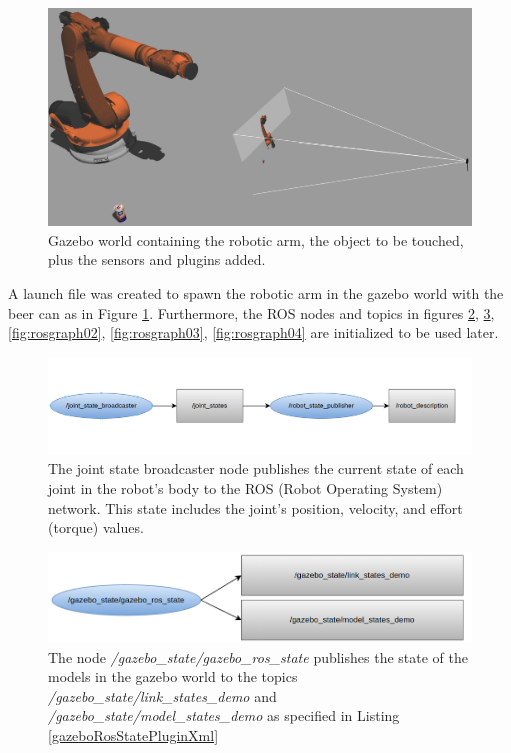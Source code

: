 \documentclass[12pt,oneside]{article}
\begin{document}
\begin{figure}[H]
	\centering
	\includegraphics[width=0.95\linewidth]{kuka4}
	\caption[Gazebo World.]{Gazebo world containing the robotic arm, the object to be touched, plus the sensors and plugins added.}
	\label{fig:kuka4}
\end{figure}

A launch file was created to spawn the robotic arm in the gazebo world with the beer can as in Figure \ref{fig:kuka4}. Furthermore, the ROS nodes and topics in figures \ref{fig:rosgraph00}, \ref{fig:rosgraph01}, \ref{fig:rosgraph02}, \ref{fig:rosgraph03}, \ref{fig:rosgraph04} are initialized to be used later.


\begin{figure}[H]
\centering
\includegraphics[width=0.95\linewidth]{rosgraph00}
\caption[The joint\_state\_broadcaster node.]{The joint state broadcaster node publishes the current state of each joint in the robot's body to the ROS (Robot Operating System) network. This state includes the joint's position, velocity, and effort (torque) values. }
\label{fig:rosgraph00}
\end{figure}
 
\begin{figure}[H]
\centering
\includegraphics[width=0.95\linewidth]{rosgraph01_n}
\caption[The gazebo\_ros\_state node.]{The node \textit{/gazebo\_state/gazebo\_ros\_state} publishes the state of the models in the gazebo world to the topics \textit{/gazebo\_state/link\_states\_demo} and \textit{/gazebo\_state/model\_states\_demo} as specified in Listing \ref{gazeboRosStatePluginXml}}
\label{fig:rosgraph01}
\end{figure}
\end{document}
